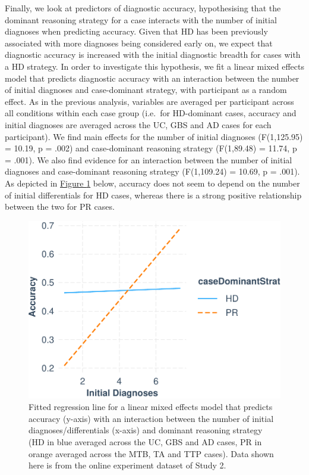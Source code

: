 \documentclass[a4paper, nobind]{templates/ociamthesis}
\begin{document}
\hfill\break
Finally, we look at predictors of diagnostic accuracy, hypothesising that the dominant reasoning strategy for a case interacts with the number of initial diagnoses when predicting accuracy. Given that HD has been previously associated with more diagnoses being considered early on, we expect that diagnostic accuracy is increased with the initial diagnostic breadth for cases with a HD strategy. In order to investigate this hypothesis, we fit a linear mixed effects model that predicts diagnostic accuracy with an interaction between the number of initial diagnoses and case-dominant strategy, with participant as a random effect. As in the previous analysis, variables are averaged per participant across all conditions within each case group (i.e.~for HD-dominant cases, accuracy and initial diagnoses are averaged across the UC, GBS and AD cases for each participant). We find main effects for the number of initial diagnoses (F(1,125.95) = 10.19, p = .002) and case-dominant reasoning strategy (F(1,89.48) = 11.74, p = .001). We also find evidence for an interaction between the number of initial diagnoses and case-dominant reasoning strategy (F(1,109.24) = 10.69, p = .001). As depicted in \hyperref[fig:accmodelplot]{Figure \ref{fig:accmodelplot}} below, accuracy does not seem to depend on the number of initial differentials for HD cases, whereas there is a strong positive relationship between the two for PR cases.

\newpage

\begin{figure}[H]
\includegraphics{_main_files/figure-latex/accmodelplot-1} \caption[Think-Aloud Study: Initial Differentials and Reasoning Strategy against Accuracy (Regression)]{Fitted regression line for a linear mixed effects model that predicts accuracy (y-axis) with an interaction between the number of initial diagnoses/differentials (x-axis) and dominant reasoning strategy (HD in blue averaged across the UC, GBS and AD cases, PR in orange averaged across the MTB, TA and TTP cases). Data shown here is from the online experiment dataset of Study 2.}\label{fig:accmodelplot}
\end{figure}
\end{document}
